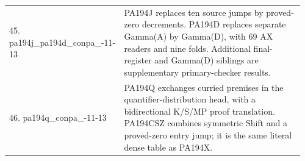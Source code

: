 \begin{longtable}{@{}p{0.35\linewidth}p{0.61\linewidth}@{}}
45. pa194j\_\allowbreak pa194d\_\allowbreak conpa\_\allowbreak 2026-11-13 & PA194J replaces ten source jumps by proved-zero decrements. PA194D replaces separate Gamma(A) by Gamma(D), with 69 AX readers and nine folds. Additional final-register and Gamma(D) siblings are supplementary primary-checker results.\\[4pt]
46. pa194q\_\allowbreak conpa\_\allowbreak 2026-11-13 & PA194Q exchanges curried premises in the quantifier-distribution head, with a bidirectional K/S/MP proof translation. PA194CSZ combines symmetric Shift and a proved-zero entry jump; it is the same literal dense table as PA194X.\\[4pt]
\bottomrule
\end{longtable}
